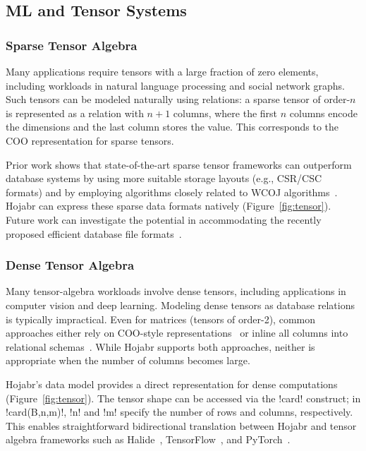 \documentclass[sigconf,nonacm]{acmart}
\begin{document}
\subsection{ML and Tensor Systems}
\subsubsection{Sparse Tensor Algebra}
Many applications require tensors with a large fraction of zero elements, including workloads in natural language processing and social network graphs. Such tensors can be modeled naturally using relations: a sparse tensor of order-$n$ is represented as a relation with $n+1$ columns, where the first $n$ columns encode the dimensions and the last column stores the value. This corresponds to the COO representation for sparse tensors.



Prior work shows that state-of-the-art sparse tensor frameworks can outperform database systems by using more suitable storage layouts (e.g., CSR/CSC formats) and by employing algorithms closely related to WCOJ algorithms~\cite{shaikhha2024tensor,schleich2023optimizing,kovach2023indexed}. Hojabr can express these sparse data formats natively (Figure~\ref{fig:tensor}). Future work can investigate the potential in accommodating the recently proposed efficient database file formats~\cite{afroozeh2025fastlanes}.

\subsubsection{Dense Tensor Algebra}
Many tensor-algebra workloads involve dense tensors, including applications in computer vision and deep learning. Modeling dense tensors as database relations is typically impractical. Even for matrices (tensors of order-2), common approaches either rely on COO-style representations~\cite{blacher2023efficient} or inline all columns into relational schemas~\cite{shahrokhi2024pytond,blacher2022machine}. While Hojabr supports both approaches, neither is appropriate when the number of columns becomes large.

Hojabr’s data model provides a direct representation for dense computations (Figure~\ref{fig:tensor}). The tensor shape can be accessed via the !card! construct; in !card(B,n,m)!, !n! and !m! specify the number of rows and columns, respectively. This enables straightforward bidirectional translation between Hojabr and tensor algebra frameworks such as Halide~\cite{ragan2013halide}, TensorFlow~\cite{abadi2016tensorflow}, and PyTorch~\cite{paszke2019pytorch}.
\end{document}
